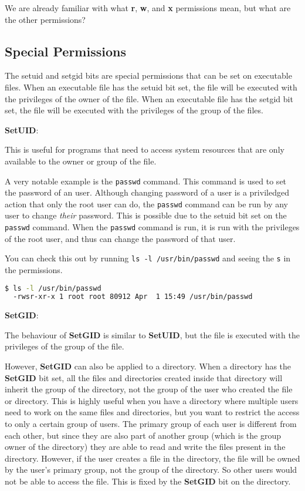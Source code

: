 We are already familiar with what
\textbf{r},
\textbf{w}, and
\textbf{x}
permissions mean, but what are the other permissions?

\subsection{Special Permissions}

\begin{definition}
  The setuid and setgid bits are special permissions that can be set on executable files.
  When an executable file has the setuid bit set, the file will be executed with the privileges of the owner of the file.
  When an executable file has the setgid bit set, the file will be executed with the privileges of the group of the files.
\end{definition}

\textbf{SetUID}:

This is useful for programs that need to access system resources that are only available to the owner or group of the file.

A very notable example is the \texttt{passwd} command.
This command is used to set the password of an user.
Although changing password of a user is a priviledged action that only the root user can do, the \texttt{passwd} command can be run by any user to change \textit{their} password.
This is possible due to the setuid bit set on the \texttt{passwd} command.
When the \texttt{passwd} command is run, it is run with the privileges of the root user, and thus can change the password of that user.

You can check this out by running \texttt{ls -l /usr/bin/passwd} and seeing the \texttt{s} in the permissions.

\begin{lstlisting}[language=bash]
  $ ls -l /usr/bin/passwd
  -rwsr-xr-x 1 root root 80912 Apr  1 15:49 /usr/bin/passwd
\end{lstlisting}

\textbf{SetGID}:

The behaviour of \textbf{SetGID} is similar to \textbf{SetUID}, but the file is executed with the privileges of the group of the file.

However, \textbf{SetGID} can also be applied to a directory.
When a directory has the \textbf{SetGID} bit set, all the files and directories created inside that directory will inherit the group of the directory, not the group of the user who created the file or directory.
This is highly useful when you have a directory where multiple users need to work on the same files and directories, but you want to restrict the access to only a certain group of users.
The primary group of each user is different from each other, but since they are also part of another group (which is the group owner of the directory) they are able to read and write the files present in the directory.
However, if the user creates a file in the directory, the file will be owned by the user's primary group, not the group of the directory.
So other users would not be able to access the file.
This is fixed by the \textbf{SetGID} bit on the directory.

